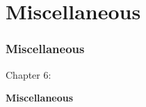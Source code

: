 %

\section{Miscellaneous}
\begin{frame}[fragile]
	\frametitle{Miscellaneous}

	\begin{center}\huge{Chapter 6:}\end{center}
	\begin{center}\huge{\color{typo3darkgrey}\textbf{Miscellaneous}}\end{center}

\end{frame}

